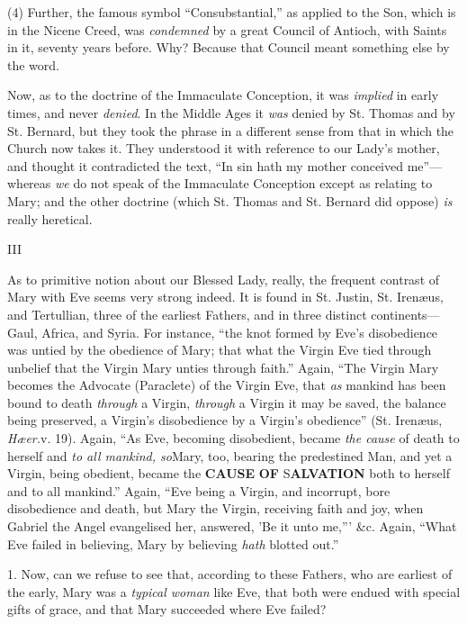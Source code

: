(4) Further, the famous symbol ``Consubstantial,''
as applied to the Son, which is in the Nicene Creed, was \emph{condemned}
by a great Council of Antioch, with Saints in it, seventy years before.
Why? Because that Council meant something else by the word.

Now, as to the doctrine of the
Immaculate Conception, it was \emph{implied} in early times, and never \emph{denied}.
In the Middle Ages it \emph{was} denied by St. Thomas and by St.
Bernard, but they took the phrase in a different sense from that in
which the Church now takes it. They understood it with reference to our
Lady's mother, and thought it contradicted the text, ``In sin hath my
mother conceived me''—whereas \emph{we} do not speak of the Immaculate
Conception except as relating to Mary; and the other doctrine (which St.
Thomas and St. Bernard did oppose) \emph{is} really heretical.

III

As to primitive notion about our
Blessed Lady, really, the frequent contrast of Mary with Eve seems very
strong indeed. It is found in St. Justin, St. Irenæus, and Tertullian,
three of the earliest Fathers, and in three distinct continents—Gaul,
Africa, and Syria. For instance, ``the knot formed by Eve's disobedience was untied by the obedience of Mary; that what the Virgin
Eve tied through unbelief that the Virgin Mary unties through faith.''
Again, ``The Virgin Mary becomes the Advocate (Paraclete) of the Virgin
Eve, that \emph{as} mankind has been bound to death \emph{through} a
Virgin, \emph{through} a Virgin it may be saved, the balance being
preserved, a Virgin's disobedience by a Virgin's obedience'' (St. Irenæus,
\emph{Hæer.}v. 19). Again, ``As Eve, becoming disobedient, became \emph{the
cause} of death to herself and \emph{to all mankind, so}Mary, too,
bearing the predestined Man, and yet a Virgin, being obedient, became
the \textbf{CAUSE}
\textbf{OF} S\textbf{ALVATION}
both to herself and to all mankind.'' Again, ``Eve being a Virgin, and
incorrupt, bore disobedience and death, but Mary the Virgin, receiving
faith and joy, when Gabriel the Angel evangelised her, answered, 'Be it
unto me,''' \&c. Again, ``What Eve failed in believing, Mary by
believing \emph{hath} blotted out.''

1. Now, can we refuse to see
that, according to these Fathers, who are earliest of the early, Mary
was a \emph{typical woman} like Eve, that both were endued with special
gifts of grace, and that Mary succeeded where Eve failed?

